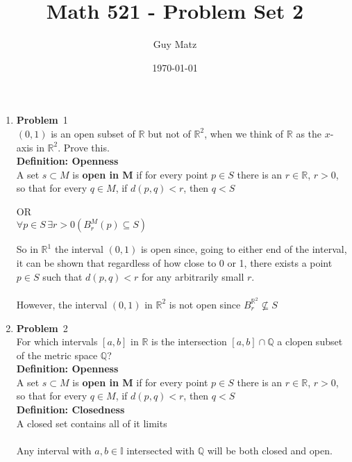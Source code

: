 \documentclass[12pt]{amsart}
\title{\textbf{Math 521 - Problem Set 2}}
\author{Guy Matz}
\date{\today}
\theoremstyle{definition}
\newcommand{\mbR}{\mathbb{R}}
\newcommand{\mbQ}{\mathbb{Q}}
\newcommand{\mbI}{\mathbb{I}}
\newcommand{\itep}{\item {\bfseries Problem}\ }
\begin{document}
 

\maketitle
\newpage %

\begin{enumerate}[series=p]
\itep 1 \\
$(0, 1)$ is an open subset of $\mbR$ but not of $\mbR^2$, when we think of $\mbR$ as the $x$-axis in $\mbR^2$.  Prove this.
\\

\textbf{Definition: Openness}\\
	A set $s \subset M$ is \textbf{open in M} if for every point $p \in S$ there is an $r \in \mbR$, $r>0$, so that for every $q \in M$,
	if $d(p,q) < r$, then $q < S$
	\begin{center}
		OR
		\\
		$\forall p \in S \, \exists r > 0 (B_r^M(p) \subseteq S)$
	\end{center}
So in $\mbR^1$ the interval $(0,1)$ is open since, going to either end of the interval, it can be shown that regardless of how close to 0 or 1, there exists a point $p \in S$ such that $d(p,q) < r$ for any arbitrarily small $r$.
\\
\\
However, the interval $(0,1)$ in $\mbR^2$ is not open since $B_r^{\mbR^2} \nsubseteq S$

\newpage

\itep 2 \\
For which intervals $[a,b]$ in $\mbR$ is the intersection $[a,b] \cap \mbQ$ a clopen subset of the metric space $\mbQ$?
\\
\textbf{Definition: Openness}\\
A set $s \subset M$ is \textbf{open in M} if for every point $p \in S$ there is an $r \in \mbR$, $r>0$, so that for every $q \in M$,
if $d(p,q) < r$, then $q < S$
\\
\textbf{Definition: Closedness}\\
A closed set contains all of it limits\\
\\
Any interval with $a, b \in \mbI$ intersected with $\mbQ$ will be  both closed and open.
\newpage


\end{enumerate}
\end{document}
